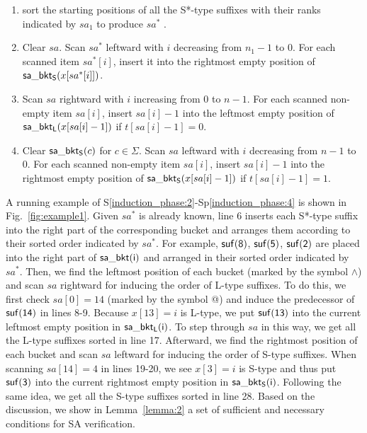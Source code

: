 \documentclass[10pt,journal,compsoc]{IEEEtran}
\begin{document}
\begin{enumerate}[S1'']
	\item sort the starting positions of all the S*-type suffixes with their ranks indicated by $sa_1$ to produce $sa^*$ \label{induction_phase:1}.

	\item Clear $sa$. Scan $sa^*$ leftward with $i$ decreasing from $n_1 - 1$ to $0$. For each scanned item $sa^*[i]$, insert it into the rightmost empty position of ${\sf sa\_bkt_S}(x[sa^*[i]])$. \label{induction_phase:2}
	
	\item Scan $sa$ rightward with $i$ increasing from $0$ to $n - 1$. For each scanned non-empty item $sa[i]$, insert $sa[i] - 1$ into the leftmost empty position of ${\sf sa\_bkt_L}(x[sa[i] - 1])$ if $t[sa[i] - 1] = 0$.\label{induction_phase:3}
	
	\item Clear ${\sf sa\_bkt_S}(c)$ for $c \in \Sigma$. Scan $sa$ leftward with $i$ decreasing from $n - 1$ to $0$. For each scanned non-empty item $sa[i]$, insert $sa[i] - 1$ into the rightmost empty position of ${\sf sa\_bkt_S}(x[sa[i] - 1])$ if $t[sa[i] - 1] = 1$.\label{induction_phase:4}
	
\end{enumerate}

A running example of S\ref{induction_phase:2}-Sp\ref{induction_phase:4} is shown in Fig.~\ref{fig:example1}. Given $sa^*$ is already known, line 6 inserts each S*-type suffix into the right part of the corresponding bucket and arranges them according to their sorted order indicated by $sa^*$. For example, $\sf suf(8)$, $\sf suf(5)$, $\sf suf(2)$ are placed into the right part of $\sf sa\_bkt(i)$ and arranged in their sorted order indicated by $sa^*$. Then, we find the leftmost position of each bucket (marked by the symbol $\wedge$) and scan $sa$ rightward for inducing the order of L-type suffixes. To do this, we first check $sa[0] = 14$ (marked by the symbol @) and induce the predecessor of $\sf suf(14)$ in lines 8-9. Because $x[13] = i$ is L-type, we put $\sf suf(13)$ into the current leftmost empty position in $\sf sa\_bkt_L(i)$. To step through $sa$ in this way, we get all the L-type suffixes sorted in line 17. Afterward, we find the rightmost position of each bucket and scan $sa$ leftward for inducing the order of S-type suffixes. When scanning $sa[14] = 4$ in lines 19-20, we see $x[3] = i$ is S-type and thus put $\sf suf(3)$ into the current rightmost empty position in $\sf sa\_bkt_S(i)$. Following the same idea, we get all the S-type suffixes sorted in line 28. Based on the discussion, we show in Lemma~\ref{lemma:2} a set of sufficient and necessary conditions for SA verification.
\end{document}
